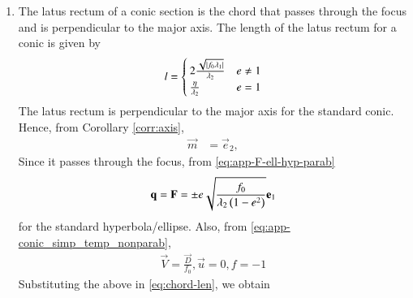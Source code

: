 \begin{enumerate}[label=\thesubsection.\arabic*.,ref=\thesubsection.\theenumi]
		\begin{proof}
From		\eqref{corr:axis}, the major/symmetry axis for the hyperbola/ellipse/parabola can be expressed using 
	\eqref{eq:conic_affine}
 as
  \begin{align}
	  \vec{e}_2^{\top}
		  \vec{P}^{\top}\brak{\vec{x}-\vec{c}} &= 0
		  \\
	  \implies 		  \brak{\vec{P}\vec{e}_2}^{\top}\brak{\vec{x}-\vec{c}} &= 0
  \end{align}
yielding	  \eqref{eq:app-major-minor-axis-quad}, and the proof for the minor axis is similar.
		\end{proof}
\item
    The latus rectum of a conic section is the chord that passes through the focus and is perpendicular to the major axis.
	The length of the latus rectum for a conic is given by
		\begin{align}
			l =
			\begin{cases}
				2\frac{\sqrt{\left\vert f_0\lambda_1\right\vert}}{\lambda_2} & e \ne 1
			\\
			\frac{\eta}{\lambda_2} & e = 1
			\end{cases}
			\label{eq:app-latus-ellipse}
		\end{align}
		\label{app:latus}
		\solution
			The latus rectum is perpendicular to the major axis for the standard conic.  Hence, from Corollary  
		\eqref{corr:axis},
  \begin{align}
  \vec{m}&= \vec{e}_2,  
\end{align}  
Since it passes through the focus, from 
					\eqref{eq:app-F-ell-hyp-parab}
  \begin{align}
	  \mathbf{q} =			\mathbf{F} 
=
					 \pm e\sqrt{\frac{f_0}{\lambda_2\left(1-e^2\right)}} \mathbf{e }_1
\end{align}  
for the standard hyperbola/ellipse.  Also, 
from 
    \eqref{eq:app-conic_simp_temp_nonparab},
  \begin{align}
	  \vec{V} =     \frac{\vec{D} }{f_0}, 
	   \vec{u} = 0, 
	   f = -1
	    \label{eq:latus_rectum_ellipse_param-new}
\end{align}  
Substituting the above in
\eqref{eq:chord-len}, 
we obtain
\begin{align}

\end{align}
\end{enumerate}
